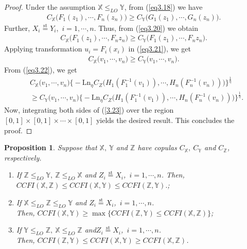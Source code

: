 \documentclass[12pt, a4paper]{article}
\numberwithin{equation}{section}
\newtheorem{proposition}{Proposition}[section]
\begin{document}
\begin{proof}
Under the assumption $\mathbb{X}\le_{LO}\mathbb{Y}$, from (\ref{eq3.18}) we have
\begin{align}\label{eq3.20}
C_\mathbb{X}\big(F_1(z_1),\cdots, F_n(z_n)\big)\ge C_\mathbb{Y}\big(G_1(z_1),\cdots, G_n(z_n)\big).
\end{align}
Further, $X_i\overset{\mathrm{st}}{=}Y_i$,~$i=1,\cdots,n$. Thus, from (\ref{eq3.20}) we obtain
\begin{align}\label{eq3.21}
C_\mathbb{X}\big(F_1(z_1),\cdots, F_nz_n\big)\ge C_\mathbb{Y}\big(F_1(z_1),\cdots, F_nz_n\big).
\end{align}
Applying transformation $u_i=F_i(x_i)$ in (\ref{eq3.21}), we get
\begin{align}\label{eq3.22}
C_\mathbb{X}\big(v_1,\cdots, v_n\big)\ge C_\mathbb{Y}\big(v_1,\cdots, v_n\big).
\end{align}
From (\ref{eq3.22}), we get
\begin{align}\label{3.23}
&C_\mathbb{X}\big(v_1,\cdots, v_n\big)\Big\{-\mathrm{Ln}_\eta C_Z\big(H_1(F_1^{-1}(v_1)),\cdots,H_n(F_n^{-1}(v_n))\big)\Big\}^{\frac{1}{\eta}}\nonumber\\
&\ge C_\mathbb{Y}\big(v_1,\cdots, v_n\big)\Big\{-\mathrm{Ln}_\eta C_Z\big(H_1(F_1^{-1}(v_1)),\cdots,H_n(F_n^{-1}(v_n))\big)\Big\}^{\frac{1}{\eta}}.
\end{align}
Now, integrating both sides of (\ref{3.23}) over the region $[0,1] \times [0,1] \times \cdots \times [0,1]$ yields the desired result. This concludes the proof.
\end{proof}



\begin{proposition}\label{prop3.6}
Suppose that $\mathbb{X},~\mathbb{Y}$ and $\mathbb{Z}$ have copulas $C_\mathbb{X},~C_\mathbb{Y}$ and $C_\mathbb{Z}$, respectively. 
\begin{enumerate}
\item If $\mathbb{Z}\le_{LO}\mathbb{Y},~\mathbb{Z}\le_{LO}\mathbb{X}$ and $Z_i\overset{\mathrm{st}}{=}X_i$,~$i=1,\cdots,n$. 
Then, $CCFI(\mathbb X,\mathbb Z)\leq CCFI(\mathbb X,\mathbb Y)\le CCFI(\mathbb Z,\mathbb Y).$;
\item  If $\mathbb{X}\le_{LO}\mathbb{Z}\le_{LO}\mathbb{Y}$ and $Z_i\overset{\mathrm{st}}{=}X_i$,~$i=1,\cdots,n$. \\Then,
 $CCFI(\mathbb{X},\mathbb{Y})\ge \max\{CCFI(\mathbb{Z},\mathbb{Y})\le CCFI(\mathbb{X},\mathbb{Z})\}$;
\item If $\mathbb{Y}\le_{LO}\mathbb{Z},~\mathbb{X}\le_{LO}\mathbb{Z}$ and$Z_i\overset{\mathrm{st}}{=}X_i$,~$i=1,\cdots,n$. \\Then,
 $CCFI(\mathbb Z,\mathbb Y)\leq CCFI(\mathbb{X},\mathbb{Y})\ge CCFI(\mathbb X,\mathbb Z)$.
\end{enumerate}
\end{proposition}
\end{document}
